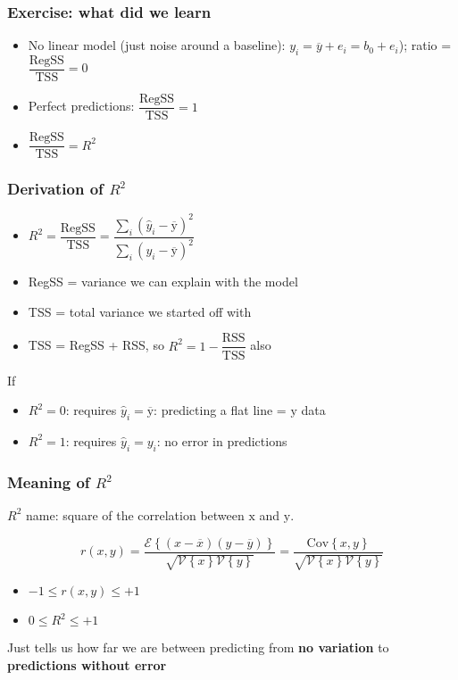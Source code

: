 \begin{frame}\frametitle{Exercise: what did we learn}
	\begin{itemize}
		\item	No linear model (just noise around a baseline): $y_i = \overline{y} + e_i = b_0 + e_i$); ratio = $\dfrac{\text{RegSS}}{\text{TSS}} = 0$ 
		\item	Perfect predictions: $\dfrac{\text{RegSS}}{\text{TSS}} = 1$ 
		\item	$\dfrac{\text{RegSS}}{\text{TSS}} = R^2$ 
	\end{itemize}
\end{frame}

\begin{frame}\frametitle{Derivation of $R^2$}
	\begin{itemize}
		\item	$R^2 = \dfrac{\text{RegSS}}{\text{TSS}} = \dfrac{\sum_i{ \left(\hat{y}_i - \overline{\mathrm{y}}\right)^2}}{\sum_i{ \left(y_i - \overline{\mathrm{y}}\right)^2}}$ 
		\item	RegSS = variance we can explain with the model 
		\item	TSS = total variance we started off with 
		\item	TSS = RegSS + RSS, so $R^2 = 1-\dfrac{\text{RSS}}{\text{TSS}}$ also 
	\end{itemize}
	
	If 
	\begin{itemize}
		\item	$R^2 = 0$: requires $\hat{y}_i = \overline{\mathrm{y}}$: predicting a flat line = $\mathrm{y}$ data 
		\item	$R^2 = 1$: requires $\hat{y}_i = y_i$: no error in predictions 
	\end{itemize}
\end{frame}

\begin{frame}\frametitle{Meaning of $R^2$}
	
	$R^2$ name: square of the correlation between $\mathrm{x}$ and $\mathrm{y}$.
	
	$$ r(x, y) = \dfrac{\mathcal{E}\left\{ (x - \overline{x}) (y - \overline{y})\right\}}{\sqrt{\mathcal{V}\left\{x\right\}\mathcal{V}\left\{y\right\}}} = \dfrac{\text{Cov}\left\{x, y\right\}}{\sqrt{\mathcal{V}\left\{x\right\}\mathcal{V}\left\{y\right\}}} $$
	\begin{itemize}
		\item	$-1 \leq r(x,y) \leq +1$ 
		\item	$0 \leq R^2 \leq +1 $ 
	\end{itemize}
	
	Just tells us how far we are between predicting from \textbf{no variation} to \textbf{predictions without error}
\end{frame}

